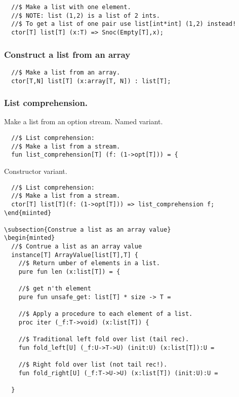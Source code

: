 \documentclass[oneside]{book}
\begin{document}
\begin{verbatim}
  //$ Make a list with one element.
  //$ NOTE: list (1,2) is a list of 2 ints.
  //$ To get a list of one pair use list[int*int] (1,2) instead!
  ctor[T] list[T] (x:T) => Snoc(Empty[T],x);
\end{verbatim}

\subsubsection{Construct a list from an array}
\begin{verbatim}
  //$ Make a list from an array.
  ctor[T,N] list[T] (x:array[T, N]) : list[T];
\end{verbatim}

\subsubsection{List comprehension.}
Make a list from an option stream.
Named variant.

\begin{verbatim}
  //$ List comprehension:
  //$ Make a list from a stream.
  fun list_comprehension[T] (f: (1->opt[T])) = {
\end{verbatim}

Constructor variant.

\begin{verbatim}
  //$ List comprehension:
  //$ Make a list from a stream.
  ctor[T] list[T](f: (1->opt[T])) => list_comprehension f;
\end{miinted}

\subsection{Construe a list as an array value}
\begin{minted}
  //$ Contrue a list as an array value
  instance[T] ArrayValue[list[T],T] {
    //$ Return umber of elements in a list.
    pure fun len (x:list[T]) = {

    //$ get n'th element
    pure fun unsafe_get: list[T] * size -> T =

    //$ Apply a procedure to each element of a list.
    proc iter (_f:T->void) (x:list[T]) {

    //$ Traditional left fold over list (tail rec).
    fun fold_left[U] (_f:U->T->U) (init:U) (x:list[T]):U =

    //$ Right fold over list (not tail rec!).
    fun fold_right[U] (_f:T->U->U) (x:list[T]) (init:U):U =

  }
\end{verbatim}
\end{document}
